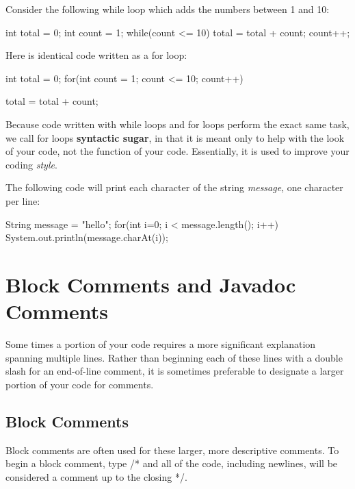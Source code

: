 \begin{exa}
Consider the following while loop which adds the numbers between 1 and 10:


\begin{code}
int total = 0;
int count = 1;
while(count <= 10) {
  total = total + count;
  count++;
}
\end{code}

Here is identical code written as a for loop:


\begin{code}

int total = 0;
for(int count = 1; count <= 10; count++) {

  total = total + count;
}
\end{code}
\end{exa}

Because code written with while loops and for loops perform the exact same task, we call for loops \textbf{syntactic sugar}, in that it is meant only to help with the look of your code, not the function of your code. Essentially, it is used to improve your coding \textit{style}.

\begin{exa}
The following code will print each character of the string \textit{message}, one character per line:

\begin{code}
String message = "hello";
for(int i=0; i < message.length(); i++) {
  System.out.println(message.charAt(i));
}
\end{code}

\end{exa}


\section{Block Comments and Javadoc Comments}

Some times a portion of your code requires a more significant explanation spanning multiple lines. Rather than beginning each of these lines with a double slash for an end-of-line comment, it is sometimes preferable to designate a larger portion of your code for comments. 

\subsection{Block Comments}

Block comments are often used for these larger, more descriptive comments. To begin a block comment, type /* and all of the code, including newlines, will be considered a comment up to the closing */.

